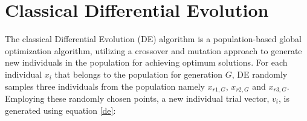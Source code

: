 \documentclass[a4paper,twoside]{article}
\begin{document}




\section{Classical Differential Evolution}

The classical Differential Evolution (DE) algorithm is a population-based global optimization algorithm, utilizing a crossover and mutation approach to generate new individuals in the population for achieving optimum solutions\cite{das2011differential}. For each individual $x_i$ that belongs to the population for generation $G$, DE randomly samples three individuals from the population namely $x_{r1,G}$, $x_{r2,G}$ and $x_{r3,G}$. Employing these randomly chosen points, a new individual trial vector, $v_i$, is generated using equation \eqref{de}:
\end{document}
